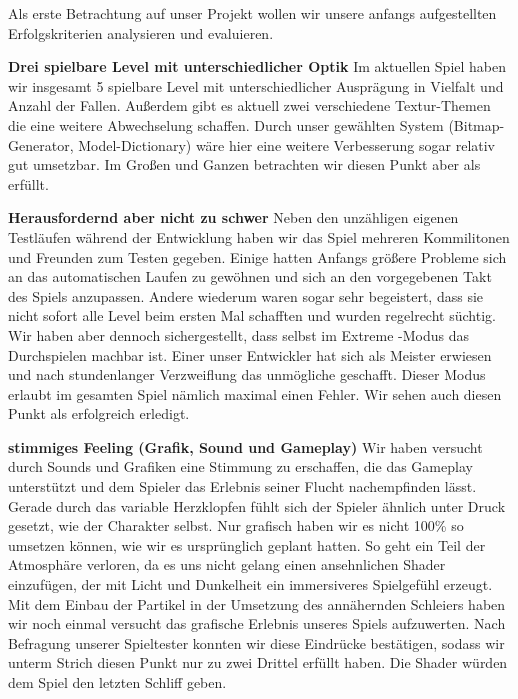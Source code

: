 \documentclass[10pt]{article}
\begin{document}
Als erste Betrachtung auf unser Projekt wollen wir unsere anfangs aufgestellten Erfolgskriterien analysieren und evaluieren. \newline
\vspace{0.5cm}

\noindent \textbf{Drei spielbare Level mit unterschiedlicher Optik} \newline
Im aktuellen Spiel haben wir insgesamt 5 spielbare Level mit unterschiedlicher Ausprägung in Vielfalt und Anzahl der Fallen. Außerdem gibt es aktuell zwei verschiedene Textur-Themen die eine weitere Abwechselung schaffen.
Durch unser gewählten System (Bitmap-Generator, Model-Dictionary) wäre hier eine weitere Verbesserung sogar relativ gut umsetzbar.
Im Großen und Ganzen betrachten wir diesen Punkt aber als erfüllt.
\vspace{0.5cm}

\noindent \textbf{Herausfordernd aber nicht zu schwer} \newline
Neben den unzähligen eigenen Testläufen während der Entwicklung haben wir das Spiel mehreren Kommilitonen und Freunden zum Testen gegeben. Einige hatten Anfangs größere Probleme sich an das automatischen Laufen  zu gewöhnen und sich an den vorgegebenen Takt des Spiels anzupassen. Andere wiederum waren sogar sehr begeistert, dass sie nicht sofort alle Level beim ersten Mal schafften und wurden regelrecht süchtig. Wir haben aber dennoch sichergestellt, dass selbst im \glqq Extreme \grqq-Modus das Durchspielen machbar ist. Einer unser Entwickler hat sich als Meister erwiesen und nach stundenlanger Verzweiflung das unmögliche geschafft. Dieser Modus erlaubt im gesamten Spiel nämlich maximal einen Fehler. 
Wir sehen auch diesen Punkt als erfolgreich erledigt.
\vspace{0.5cm}

\noindent \textbf{stimmiges Feeling (Grafik, Sound und Gameplay)} \newline
Wir haben versucht durch Sounds und Grafiken eine Stimmung zu erschaffen, die das Gameplay unterstützt und dem Spieler das Erlebnis seiner Flucht nachempfinden lässt. Gerade durch das variable Herzklopfen fühlt sich der Spieler ähnlich unter Druck gesetzt, wie der Charakter selbst.
Nur grafisch haben wir es nicht 100\% so umsetzen können, wie wir es ursprünglich geplant hatten. So geht ein Teil der Atmosphäre verloren, da es uns nicht gelang einen ansehnlichen Shader einzufügen, der mit Licht und Dunkelheit ein immersiveres Spielgefühl erzeugt. Mit dem Einbau der Partikel in der Umsetzung des annähernden Schleiers haben wir noch einmal versucht das grafische Erlebnis unseres Spiels aufzuwerten.
Nach Befragung unserer Spieltester konnten wir diese Eindrücke bestätigen, sodass wir unterm Strich diesen Punkt nur zu zwei Drittel erfüllt haben.
Die Shader würden dem Spiel den letzten Schliff geben.
\end{document}
